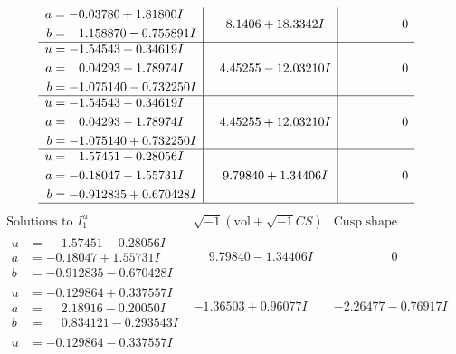 \documentclass[1p]{elsarticle_modified}
\theoremstyle{definition}
\newcommand{\I}{\sqrt{-1}}
\begin{document}
$$\begin{array}{c|c|c}
\begin{aligned}
a &= -0.03780 + 1.81800 I \\
b &= \phantom{-}1.158870 - 0.755891 I\end{aligned}
 & \phantom{-}8.1406 + 18.3342 I & \phantom{-0.000000 } 0 \\ \hline\begin{aligned}
u &= -1.54543 + 0.34619 I \\
a &= \phantom{-}0.04293 + 1.78974 I \\
b &= -1.075140 - 0.732250 I\end{aligned}
 & \phantom{-}4.45255 - 12.03210 I & \phantom{-0.000000 } 0 \\ \hline\begin{aligned}
u &= -1.54543 - 0.34619 I \\
a &= \phantom{-}0.04293 - 1.78974 I \\
b &= -1.075140 + 0.732250 I\end{aligned}
 & \phantom{-}4.45255 + 12.03210 I & \phantom{-0.000000 } 0 \\ \hline\begin{aligned}
u &= \phantom{-}1.57451 + 0.28056 I \\
a &= -0.18047 - 1.55731 I \\
b &= -0.912835 + 0.670428 I\end{aligned}
 & \phantom{-}9.79840 + 1.34406 I & \phantom{-0.000000 } 0\\
 \hline 
 \end{array}$$\newpage$$\begin{array}{c|c|c}  
\text{Solutions to }I^u_{1}& \I (\text{vol} + \sqrt{-1}CS) & \text{Cusp shape}\\
 \hline 
\begin{aligned}
u &= \phantom{-}1.57451 - 0.28056 I \\
a &= -0.18047 + 1.55731 I \\
b &= -0.912835 - 0.670428 I\end{aligned}
 & \phantom{-}9.79840 - 1.34406 I & \phantom{-0.000000 } 0 \\ \hline\begin{aligned}
u &= -0.129864 + 0.337557 I \\
a &= \phantom{-}2.18916 - 0.20050 I \\
b &= \phantom{-}0.834121 - 0.293543 I\end{aligned}
 & -1.36503 + 0.96077 I & -2.26477 - 0.76917 I \\ \hline\begin{aligned}
u &= -0.129864 - 0.337557 I \\

\end{aligned}
\end{array}$$
\end{document}
